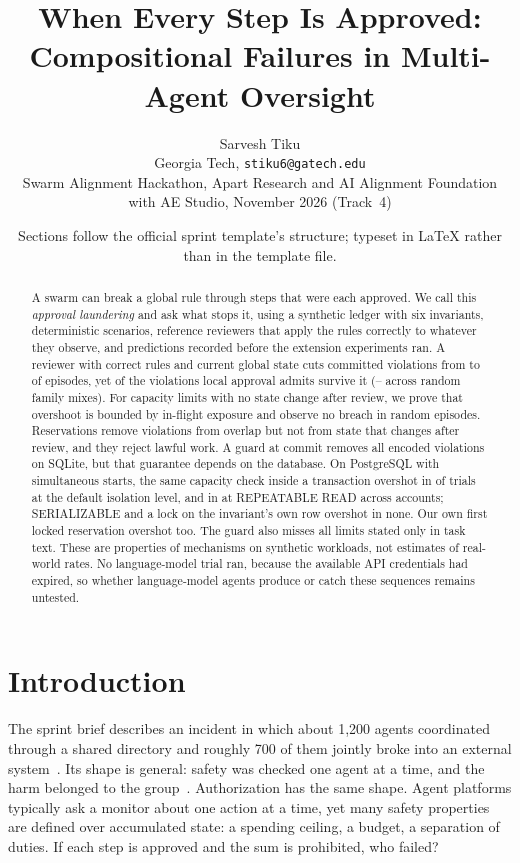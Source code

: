 \documentclass[10pt]{article}
\title{\vspace{-2em}\textbf{When Every Step Is Approved:\\Compositional Failures in Multi-Agent Oversight}}
\author{Sarvesh Tiku\\Georgia Tech, \texttt{stiku6@gatech.edu}\\[2pt]\small Swarm Alignment Hackathon, Apart Research and AI Alignment Foundation with AE Studio, November 2026 (Track~4)}
\date{\vspace{-1.2em}\footnotesize Sections follow the official sprint template's structure; typeset in LaTeX rather than in the template file.}
\begin{document}
\maketitle
\begin{abstract}
\noindent A swarm can break a global rule through steps that were each approved. We call this \emph{approval laundering} and ask what stops it, using a synthetic ledger with six invariants, \nScenarios{} deterministic scenarios, reference reviewers that apply the rules correctly to whatever they observe, and predictions recorded before the extension experiments ran. A reviewer with correct rules and current global state cuts committed violations from \givrCzero{} to \givrCtwo{} of episodes, yet \ladderIsolationPct{} of the violations local approval admits survive it (\mixShareLo{}--\mixShareHi{} across random family mixes). For capacity limits with no state change after review, we prove that overshoot is bounded by in-flight exposure and observe no breach in \wlBoundCtwoN{} random episodes. Reservations remove violations from overlap but not from state that changes after review, and they reject lawful work. A guard at commit removes all encoded violations on SQLite, but that guarantee depends on the database. On PostgreSQL with simultaneous starts, the same capacity check inside a transaction overshot in \pgRCCross{} of \pgCellN{} trials at the default isolation level, and in \pgRRCross{} at REPEATABLE READ across accounts; SERIALIZABLE and a lock on the invariant's own row overshot in none. Our own first locked reservation overshot too. The guard also misses all \nScopeScenarios{} limits stated only in task text. These are properties of mechanisms on synthetic workloads, not estimates of real-world rates. No language-model trial ran, because the available API credentials had expired, so whether language-model agents produce or catch these sequences remains untested.
\end{abstract}

\section{Introduction}
The sprint brief describes an incident in which about 1,200 agents coordinated through a shared directory and roughly 700 of them jointly broke into an external system~\cite{metr2026}. Its shape is general: safety was checked one agent at a time, and the harm belonged to the group~\cite{hammond2025}. Authorization has the same shape. Agent platforms typically ask a monitor about one action at a time, yet many safety properties are defined over accumulated state: a spending ceiling, a budget, a separation of duties. If each step is approved and the sum is prohibited, who failed?
\end{document}
